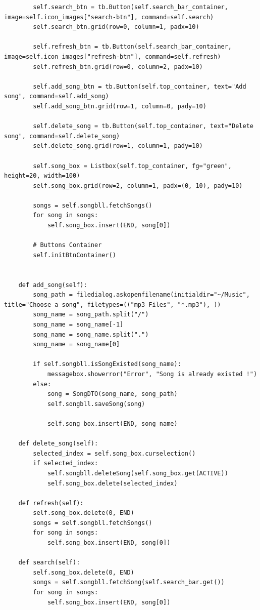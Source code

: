 \documentclass[a4paper]{article}
\begin{document}
\begin{mdframed}[hidealllines=true,backgroundcolor=magenta!10]
\begin{lstlisting}
        self.search_btn = tb.Button(self.search_bar_container, image=self.icon_images["search-btn"], command=self.search)
        self.search_btn.grid(row=0, column=1, padx=10)

        self.refresh_btn = tb.Button(self.search_bar_container, image=self.icon_images["refresh-btn"], command=self.refresh)
        self.refresh_btn.grid(row=0, column=2, padx=10)

        self.add_song_btn = tb.Button(self.top_container, text="Add song", command=self.add_song)
        self.add_song_btn.grid(row=1, column=0, pady=10)

        self.delete_song = tb.Button(self.top_container, text="Delete song", command=self.delete_song)
        self.delete_song.grid(row=1, column=1, pady=10)

        self.song_box = Listbox(self.top_container, fg="green", height=20, width=100)
        self.song_box.grid(row=2, column=1, padx=(0, 10), pady=10)

        songs = self.songbll.fetchSongs()
        for song in songs:
            self.song_box.insert(END, song[0])

        # Buttons Container
        self.initBtnContainer()


    def add_song(self):
        song_path = filedialog.askopenfilename(initialdir="~/Music", title="Choose a song", filetypes=(("mp3 Files", "*.mp3"), ))
        song_name = song_path.split("/")
        song_name = song_name[-1]
        song_name = song_name.split(".")
        song_name = song_name[0]

        if self.songbll.isSongExisted(song_name):
            messagebox.showerror("Error", "Song is already existed !")
        else:
            song = SongDTO(song_name, song_path)
            self.songbll.saveSong(song)

            self.song_box.insert(END, song_name)

    def delete_song(self):
        selected_index = self.song_box.curselection()
        if selected_index:
            self.songbll.deleteSong(self.song_box.get(ACTIVE))
            self.song_box.delete(selected_index)

    def refresh(self):
        self.song_box.delete(0, END)
        songs = self.songbll.fetchSongs()
        for song in songs:
            self.song_box.insert(END, song[0])

    def search(self):
        self.song_box.delete(0, END)
        songs = self.songbll.fetchSong(self.search_bar.get())
        for song in songs:
            self.song_box.insert(END, song[0])


\end{lstlisting}
\end{mdframed}
\end{document}
